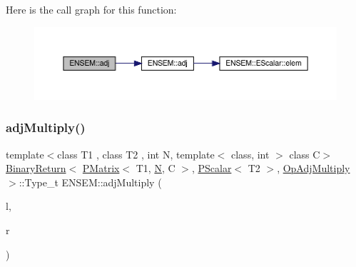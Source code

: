 Here is the call graph for this function\+:\nopagebreak
\begin{figure}[H]
\begin{center}
\leavevmode
\includegraphics[width=350pt]{df/d0a/group__primmatrix_ga443bf356f8bca93ff78f16db721417b9_cgraph}
\end{center}
\end{figure}
\mbox{\label{group__primmatrix_ga47a69844104af73a48b189fb08811b87}} 
\subsubsection{\texorpdfstring{adjMultiply()}{adjMultiply()}\hspace{0.1cm}{\footnotesize\ttfamily [1/3]}}
{\footnotesize\ttfamily template$<$class T1 , class T2 , int N, template$<$ class, int $>$ class C$>$ \\
\mbox{\hyperlink{structENSEM_1_1BinaryReturn}{Binary\+Return}}$<$ \mbox{\hyperlink{classENSEM_1_1PMatrix}{P\+Matrix}}$<$ T1, \mbox{\hyperlink{adat__devel_2lib_2hadron_2operator__name__util_8cc_a7722c8ecbb62d99aee7ce68b1752f337}{N}}, C $>$, \mbox{\hyperlink{classENSEM_1_1PScalar}{P\+Scalar}}$<$ T2 $>$, \mbox{\hyperlink{structENSEM_1_1OpAdjMultiply}{Op\+Adj\+Multiply}} $>$\+::Type\+\_\+t E\+N\+S\+E\+M\+::adj\+Multiply (\begin{DoxyParamCaption}\item[{const \mbox{\hyperlink{classENSEM_1_1PMatrix}{P\+Matrix}}$<$ T1, \mbox{\hyperlink{adat__devel_2lib_2hadron_2operator__name__util_8cc_a7722c8ecbb62d99aee7ce68b1752f337}{N}}, C $>$ \&}]{l,  }\item[{const \mbox{\hyperlink{classENSEM_1_1PScalar}{P\+Scalar}}$<$ T2 $>$ \&}]{r }\end{DoxyParamCaption})\hspace{0.3cm}{\ttfamily [inline]}}

